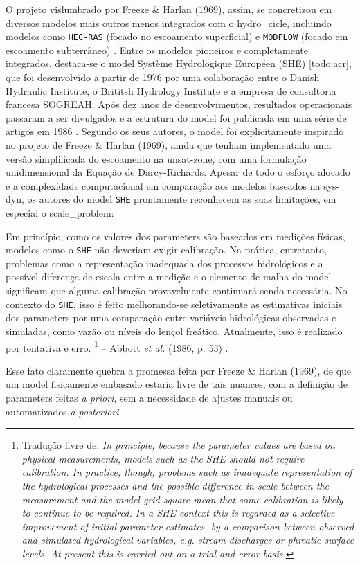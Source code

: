\documentclass[./main.tex]{subfiles}
\begin{document}
\par O projeto vislumbrado por Freeze \& Harlan (1969), assim, se concretizou em diversos modelos mais outros menos integrados com o \gls{hydro_cicle}, incluindo modelos como \texttt{HEC-RAS} (focado no escoamento superficial) e \texttt{MODFLOW} (focado em escoamento subterrâneo) \cite{Simmons2020a}. Entre os modelos pioneiros e completamente integrados, destaca-se o \gls{model} Système Hydrologique Européen (SHE) [todo:acr], que foi desenvolvido a partir de 1976 por uma colaboração entre o Danish Hydraulic Institute, o Brititsh Hydrology Institute e a empresa de consultoria francesa SOGREAH. Após dez anos de desenvolvimentos, resultados operacionais passaram a ser divulgados e a estrutura do \gls{model} foi publicada em uma série de artigos em 1986 \cite{Abbott1986a, Abbott1986b}. Segundo os seus autores, o \gls{model} foi explicitamente inspirado no projeto de Freeze \& Harlan (1969), ainda que tenham implementado uma versão simplificada do escoamento na \gls{unsat-zone}, com uma formulação unidimensional da Equação de Darcy-Richards. Apesar de todo o esforço alocado e a complexidade computacional em comparação aos modelos baseados na \gls{sys-dyn}, os autores do \gls{model} \texttt{SHE} prontamente reconhecem as suas limitações, em especial o \gls{scale_problem}:
\begin{adjustwidth}{100pt}{0pt}
\medskip
\small
Em princípio, como os valores dos \gls{parameters} são baseados em medições físicas, modelos como o \texttt{SHE} não deveriam exigir calibração. Na prática, entretanto, problemas como a representação inadequada dos processos hidrológicos e a possível diferença de escala entre a medição e o elemento de malha do \gls{model} significam que alguma calibração provavelmente continuará sendo necessária. No contexto do \texttt{SHE}, isso é feito melhorando-se seletivamente as estimativas iniciais dos \gls{parameters} por uma comparação entre variáveis hidrológicas observadas e simuladas, como vazão ou níveis do lençol freático. Atualmente, isso é realizado por tentativa e erro.
\footnote{Tradução livre de: 
\textit{
In principle, because the parameter values are based on physical measurements, models such as the SHE should not require calibration. In practice, though, problems such as inadequate representation of the hydrological processes and the possible difference in scale between the measurement and the model grid square mean that some calibration is likely to continue to be required. In a SHE context this is regarded as a selective improvement of initial parameter estimates, by a comparison between observed and simulated hydrological variables, e.g. stream discharges or phreatic surface levels. At present this is carried out on a trial and error basis. 
}} -- Abbott \textit{et al.} (1986, p. 53) \cite{Abbott1986a}.
\medskip
\end{adjustwidth}
\noindent Esse fato claramente quebra a promessa feita por Freeze \& Harlan (1969), de que um \gls{model} fisicamente embasado estaria livre de tais nuances, com a definição de \gls{parameters} feitas \textit{a priori}, sem a necessidade de ajustes manuais ou automatizados \textit{a posteriori}. 
\end{document}
